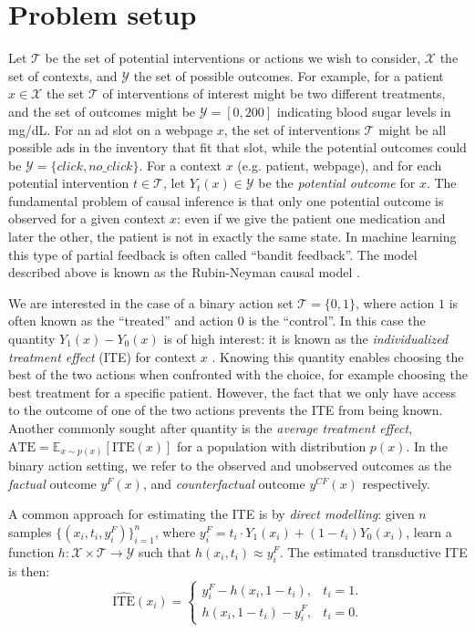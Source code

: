 \section{Problem setup}
\label{Sec:prob}

Let $\mathcal{T}$ be the set of potential interventions or actions we wish to consider, $\mathcal{X}$ the set of contexts, and $\mathcal{Y}$ the set of possible outcomes. For example, for a patient $x \in \mathcal{X}$ the set $\mathcal{T}$ of interventions of interest might be two different treatments, and the set of outcomes might be $\mathcal{Y} = [0,200]$ indicating blood sugar levels in mg/dL. For an ad slot on a webpage $x$, the set of interventions $\mathcal{T}$ might be all possible ads in the inventory that fit that slot, while the potential outcomes could be $\mathcal{Y} = \{click, no\_click\}$. For a context $x$ (e.g. patient, webpage), and for each potential intervention $t \in \mathcal{T}$, let $Y_t(x)\in \mathcal{Y}$ be the \emph{potential outcome} for $x$. The fundamental problem of causal inference is that only one potential outcome is observed for a given context $x$: even if we give the patient one medication and later the other, the patient is not in exactly the same state. In machine learning this type of partial feedback is often called ``bandit feedback''. The model described above is known as the Rubin-Neyman causal model \citep{rubin1974estimating,rubin2011causal}.

We are interested in the case of a binary action set $\mathcal{T} = \{0,1\}$, where action $1$ is often known as the ``treated'' and action $0$ is the ``control''. In this case the quantity $Y_1(x) - Y_0(x)$ is of high interest: it is known as the \emph{individualized treatment effect} (ITE) for context $x$ \cite{van2007causal,weiss2015treatment}. Knowing this quantity enables choosing the best of the two actions when confronted with the choice, for example choosing the best treatment for a specific patient.
However, the fact that we only have access to the outcome of one of the two actions prevents the ITE from being known. Another commonly sought after quantity is the \emph{average treatment effect}, $\text{ATE} = \mathbb{E}_{x\sim p(x)}[\text{ITE}(x)]$ for a population with distribution $p(x)$. In the binary action setting, we refer to the observed and unobserved outcomes as the \emph{factual} outcome $y^F(x)$, and \emph{counterfactual} outcome $y^{CF}(x)$ respectively.

A common approach for estimating the ITE is by \emph{direct modelling}: given $n$ samples $\{(x_i,t_i,y^F_i)\}_{i=1}^n$, where $y^F_i = t_i \cdot Y_{1}(x_i) + (1-t_i) Y_{0}(x_i)$, learn a function $h: \mathcal{X} \times \mathcal{T} \rightarrow \mathcal{Y}$ such that $h(x_i,t_i) \approx y^F_i$. The estimated transductive ITE is then:
\begin{equation}
  \label{eq:ite}
\hat{\text{ITE}}(x_i) = \begin{cases}
        y^F_i - h(x_i,1-t_i), & t_i = 1.\\
        h(x_i,1-t_i) - y^F_i, & t_i = 0.
        \end{cases}
\end{equation}

